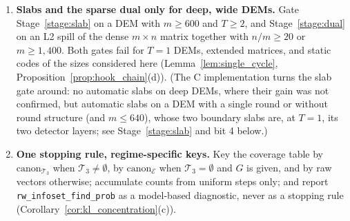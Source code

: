 \documentclass[12pt]{article}
\theoremstyle{definition}
\newcommand{\Tc}{\mathcal{T}_3}
\newcommand{\ttt}[1]{\texttt{#1}}
\begin{document}
\begin{enumerate}[label=\textbf{D\arabic*.}, ref=D\arabic*, wide=0pt]
    extended matrices (data columns, then hooks) and static codes use uniform steps only; code-sized models that
    inherit the DEM column order may keep them.
  \item\label{disp:slab_dual} \textbf{Slabs and the sparse dual only for deep, wide DEMs.} Gate
    Stage~\ref{stage:slab} on a DEM with $m \ge 600$ and $T \ge 2$, and Stage~\ref{stage:dual} on an L2 spill of the
    dense $m \times n$ matrix together with $n/m \ge 20$ or $m \ge 1{,}400$. Both gates fail for $T = 1$ DEMs,
    extended matrices, and static codes of the sizes considered here (Lemma~\ref{lem:single_cycle},
    Proposition~\ref{prop:hook_chain}(d)). (The C implementation turns the slab gate around: no automatic slabs on
    deep DEMs, where their gain was not confirmed, but automatic slabs on a DEM with a single round or without round
    structure (and $m \le 640$), whose two boundary slabs are, at $T = 1$, its two detector layers; see
    Stage~\ref{stage:slab} and bit 4 below.)
  \item\label{disp:stop} \textbf{One stopping rule, regime-specific keys.} Key the coverage table by
    $\mathrm{canon}_{\Tc}$ when $\Tc \neq \emptyset$, by $\mathrm{canon}_{\mathcal{E}}$ when $\Tc = \emptyset$ and $G$
    is given, and by raw vectors otherwise; accumulate counts from uniform steps only; and report
    \ttt{rw\_infoset\_find\_prob} as a model-based diagnostic, never as a stopping rule
    (Corollary~\ref{cor:kl_concentration}(c)).
\end{enumerate}
\end{document}
